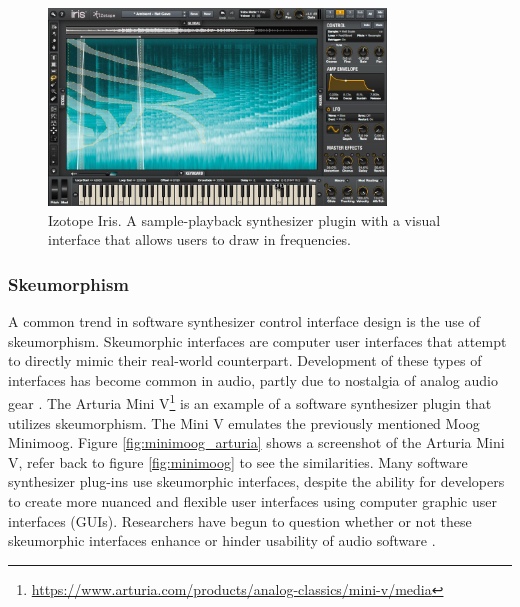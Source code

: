 \begin{figure}[ht]
    \centering
    \includegraphics[width=0.80\textwidth]{figures/background/izotope_iris.jpg}
    \caption{Izotope Iris. A sample-playback synthesizer plugin with a visual interface that allows users to draw in frequencies.}
    \label{fig:izotope_iris}
\end{figure}

\subsubsection{Skeumorphism}
A common trend in software synthesizer control interface design is the use of skeumorphism. Skeumorphic interfaces are computer user interfaces that attempt to directly mimic their real-world counterpart. Development of these types of interfaces has become common in audio, partly due to nostalgia of analog audio gear \cite{stuhl2014reactions}. The Arturia Mini V\footnote{\url{https://www.arturia.com/products/analog-classics/mini-v/media}} is an example of a software synthesizer plugin that utilizes skeumorphism. The Mini V emulates the previously mentioned Moog Minimoog. Figure \ref{fig:minimoog_arturia} shows a screenshot of the Arturia Mini V, refer back to figure \ref{fig:minimoog} to see the similarities. Many software synthesizer plug-ins use skeumorphic interfaces, despite the ability for developers to create more nuanced and flexible user interfaces using computer graphic user interfaces (GUIs). %
Researchers have begun to question whether or not these skeumorphic interfaces enhance or hinder usability of audio software \cite{lindh2018beyond}. 

